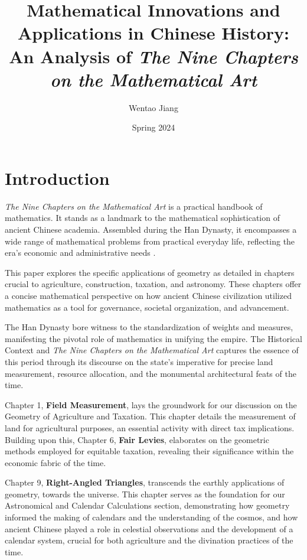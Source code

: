 \documentclass[10pt]{article}
\title{Mathematical Innovations and Applications in Chinese History: An Analysis of \textit{The Nine Chapters on the Mathematical Art}}
\author{Wentao Jiang}
\date{Spring 2024}
\begin{document}
\maketitle

\section{Introduction}

\textit{The Nine Chapters on the Mathematical Art} is a practical handbook of mathematics. It stands as a landmark to the mathematical sophistication of ancient Chinese academia. Assembled during the Han Dynasty, it encompasses a wide range of mathematical problems from practical everyday life, reflecting the era's economic and administrative needs \autocite{Kangshen_Crossley}.

\vspace{7pt}

This paper explores the specific applications of geometry as detailed in chapters crucial to agriculture, construction, taxation, and astronomy. These chapters offer a concise mathematical perspective on how ancient Chinese civilization utilized mathematics as a tool for governance, societal organization, and advancement.
\vspace{7pt}

The Han Dynasty bore witness to the standardization of weights and measures, manifesting the pivotal role of mathematics in unifying the empire. The Historical Context and \textit{The Nine Chapters on the Mathematical Art} \autocite{Kangshen_Crossley} captures the essence of this period through its discourse on the state’s imperative for precise land measurement, resource allocation, and the monumental architectural feats of the time.

\vspace{7pt}

Chapter 1, \textbf{Field Measurement}, lays the groundwork for our discussion on the Geometry of Agriculture and Taxation. This chapter details the measurement of land for agricultural purposes, an essential activity with direct tax implications. Building upon this, Chapter 6, \textbf{Fair Levies}, elaborates on the geometric methods employed for equitable taxation, revealing their significance within the economic fabric of the time.

\vspace{7pt}

Chapter 9, \textbf{Right-Angled Triangles}, transcends the earthly applications of geometry, towards the universe. This chapter serves as the foundation for our Astronomical and Calendar Calculations section, demonstrating how geometry informed the making of calendars and the understanding of the cosmos, and how ancient Chinese played a role in celestial observations and the development of a calendar system, crucial for both agriculture and the divination practices of the time.
\end{document}
